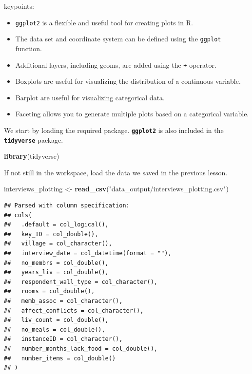 \documentclass[]{book}
\newenvironment{Shaded}{\begin{snugshade}}{\end{snugshade}}
\newcommand{\KeywordTok}[1]{\textcolor[rgb]{0.13,0.29,0.53}{\textbf{#1}}}
\newcommand{\StringTok}[1]{\textcolor[rgb]{0.31,0.60,0.02}{#1}}
\newcommand{\NormalTok}[1]{#1}
\providecommand{\tightlist}{%
  \setlength{\itemsep}{0pt}\setlength{\parskip}{0pt}}
\begin{document}
keypoints:

\begin{itemize}
\tightlist
\item
  \texttt{ggplot2} is a flexible and useful tool for creating plots in
  R.\\
\item
  The data set and coordinate system can be defined using the
  \texttt{ggplot} function.\\
\item
  Additional layers, including geoms, are added using the \texttt{+}
  operator.\\
\item
  Boxplots are useful for visualizing the distribution of a continuous
  variable.\\
\item
  Barplot are useful for visualizing categorical data.\\
\item
  Faceting allows you to generate multiple plots based on a categorical
  variable.
\end{itemize}

We start by loading the required package. \textbf{\texttt{ggplot2}} is
also included in the \textbf{\texttt{tidyverse}} package.

\begin{Shaded}
\begin{Highlighting}[]
\KeywordTok{library}\NormalTok{(tidyverse)}
\end{Highlighting}
\end{Shaded}

If not still in the workspace, load the data we saved in the previous
lesson.

\begin{Shaded}
\begin{Highlighting}[]
\NormalTok{interviews_plotting <-}\StringTok{ }\KeywordTok{read_csv}\NormalTok{(}\StringTok{"data_output/interviews_plotting.csv"}\NormalTok{)}
\end{Highlighting}
\end{Shaded}

\begin{verbatim}
## Parsed with column specification:
## cols(
##   .default = col_logical(),
##   key_ID = col_double(),
##   village = col_character(),
##   interview_date = col_datetime(format = ""),
##   no_membrs = col_double(),
##   years_liv = col_double(),
##   respondent_wall_type = col_character(),
##   rooms = col_double(),
##   memb_assoc = col_character(),
##   affect_conflicts = col_character(),
##   liv_count = col_double(),
##   no_meals = col_double(),
##   instanceID = col_character(),
##   number_months_lack_food = col_double(),
##   number_items = col_double()
## )
\end{verbatim}
\end{document}
